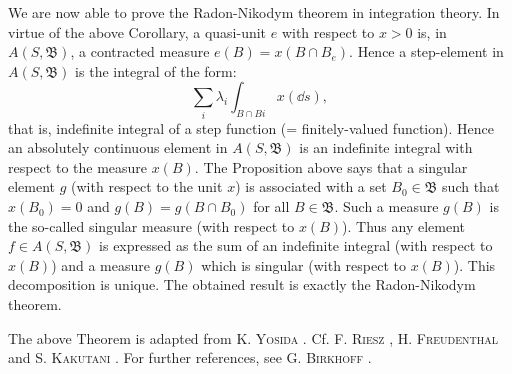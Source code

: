 We are now able to prove the Radon-Nikodym theorem in integration theory. In virtue of the above Corollary, a quasi-unit $e$ with respect to $x > 0$ is, in $A(S, \mathfrak{B})$, a contracted measure $e(B) = x(B \cap B_e)$. Hence a step-element in $A(S, \mathfrak{B})$ is the integral of the form: 
\[
\sum\limits_{i} \lambda_{i} \int_{B \cap B i} x (\dd s),
\]
that is, indefinite integral of a step function (= finitely-valued function). Hence an absolutely continuous element in $A(S, \mathfrak{B})$ is an indefinite integral with respect to the measure $x(B)$. The Proposition above says that a singular element $g$ (with respect to the unit $x$) is associated with a set $B_0 \in \mathfrak{B}$ such that $x(B_0) = 0$ and $g(B) = g(B \cap B_0)$ for all $B \in \mathfrak{B}$. Such a measure $g(B)$ is the so-called singular measure (with respect to $x(B)$). Thus any element $f \in A(S, \mathfrak{B})$ is expressed as the sum of an indefinite integral (with respect to $x(B)$) and a measure $g(B)$ which is singular (with respect to $x(B)$). This decomposition is unique. The obtained result is exactly the Radon-Nikodym theorem. 

\begin{remarku} The above Theorem is adapted from K. \textsc{Yosida} \cite{yosida345}. Cf. F. \textsc{Riesz} \cite{rickart277}, H. \textsc{Freudenthal} \cite{freudenthal67} and S. \textsc{Kakutani} \cite{kakutani129}. For further references, see G. \textsc{Birkhoff} \cite{birkhoff17}. 
\end{remarku}
